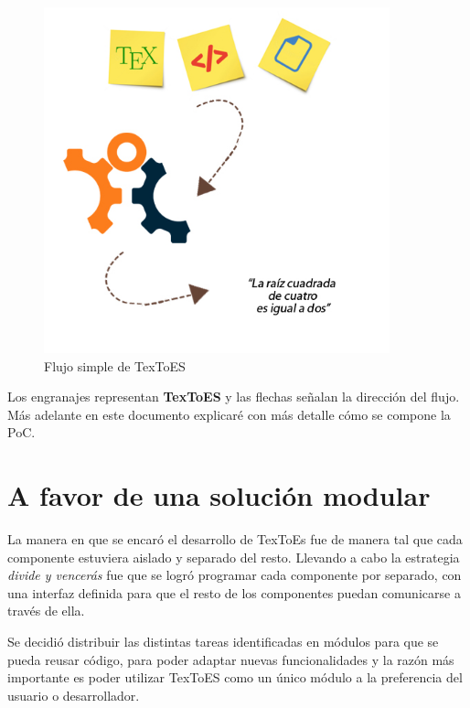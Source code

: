 \begin{figure}[H]
\centering
  \includegraphics[width=10cm, height=10cm]{Figures/arquitectura-general-textoes}
  \caption[]{Flujo simple de TexToES}
\label{fig:arquitectura}
\end{figure}

Los engranajes representan \textbf{TexToES} y las flechas señalan la dirección del flujo. Más adelante en este documento explicaré con más detalle cómo se compone la PoC.


\section{A favor de una solución modular}

La manera en que se encaró el desarrollo de TexToEs fue de manera tal que cada componente estuviera aislado y separado del resto.
Llevando a cabo la estrategia \textit{divide y vencerás} fue que se logró programar cada componente por separado, con una interfaz definida para que el resto de los componentes puedan comunicarse a través de ella.

Se decidió distribuir las distintas tareas identificadas en módulos para que se pueda reusar código, para poder adaptar nuevas funcionalidades y la razón más importante es poder utilizar TexToES como un único módulo a la preferencia del usuario o desarrollador.
\\[1cm]

